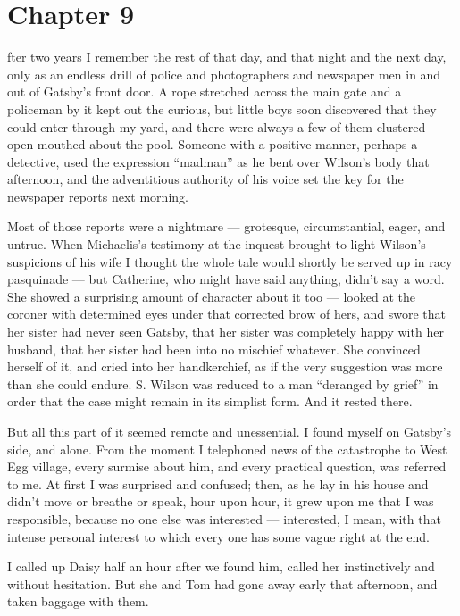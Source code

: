\documentclass{znotebook}
\begin{document}
\chapter{Chapter 9}

\lettrine[findent=2pt]{}{ }fter two years I remember the rest of that day, and that night and the next day, only as an endless drill of police and photographers and newspaper men in and out of Gatsby's front door. A rope stretched across the main gate and a policeman by it kept out the curious, but little boys soon discovered that they could enter through my yard, and there were always a few of them clustered open-mouthed about the pool. Someone with a positive manner, perhaps a detective, used the expression ``madman'' as he bent over Wilson's body that afternoon, and the adventitious authority of his voice set the key for the newspaper reports next morning.

Most of those reports were a nightmare — grotesque, circumstantial, eager, and untrue. When Michaelis's testimony at the inquest brought to light Wilson's suspicions of his wife I thought the whole tale would shortly be served up in racy pasquinade — but Catherine, who might have said anything, didn't say a word. She showed a surprising amount of character about it too — looked at the coroner with determined eyes under that corrected brow of hers, and swore that her sister had never seen Gatsby, that her sister was completely happy with her husband, that her sister had been into no mischief whatever. She convinced herself of it, and cried into her handkerchief, as if the very suggestion was more than she could endure. S. Wilson was reduced to a man ``deranged by grief'' in order that the case might remain in its simplist form. And it rested there.

But all this part of it seemed remote and unessential. I found myself on Gatsby's side, and alone. From the moment I telephoned news of the catastrophe to West Egg village, every surmise about him, and every practical question, was referred to me. At first I was surprised and confused; then, as he lay in his house and didn't move or breathe or speak, hour upon hour, it grew upon me that I was responsible, because no one else was interested — interested, I mean, with that intense personal interest to which every one has some vague right at the end.

I called up Daisy half an hour after we found him, called her instinctively and without hesitation. But she and Tom had gone away early that afternoon, and taken baggage with them.
\end{document}
